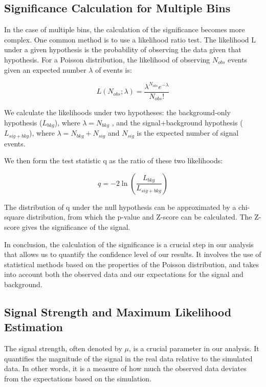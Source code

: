 \subsection{Significance Calculation for Multiple Bins}

In the case of multiple bins, the calculation of the significance becomes more complex. One common method is to use a
likelihood ratio test. The likelihood L under a given hypothesis is the probability of observing the data given that
hypothesis. For a Poisson distribution, the likelihood of observing $N_{obs}$ events given an expected number $\lambda$
of events is:

\begin{equation}
    L(N_{obs}; \lambda) = \frac{\lambda^{N_{obs}} e^{-\lambda}}{N_{obs}!}
\end{equation}

We calculate the likelihoods under two hypotheses: the background-only hypothesis ($L_{bkg}$), where $\lambda = N_{bkg}$
, and the signal+background hypothesis ($L_{sig+bkg}$), where $\lambda = N_{bkg} + N_{sig}$ and $N_{sig}$ is the
expected number of signal events.

We then form the test statistic q as the ratio of these two likelihoods:

\begin{equation}
    q = -2 \ln\left(\frac{L_{bkg}}{L_{sig+bkg}}\right)
\end{equation}

The distribution of q under the null hypothesis can be approximated by a chi-square distribution, from which the p-value
and Z-score can be calculated. The Z-score gives the significance of the signal.

In conclusion, the calculation of the significance is a crucial step in our analysis that allows us to quantify the
confidence level of our results. It involves the use of statistical methods based on the properties of the Poisson
distribution, and takes into account both the observed data and our expectations for the signal and background.

\subsection{Signal Strength and Maximum Likelihood Estimation}

The signal strength, often denoted by $\mu$, is a crucial parameter in our analysis. It quantifies the magnitude of the
signal in the real data relative to the simulated data. In other words, it is a measure of how much the observed data
deviates from the expectations based on the simulation.

